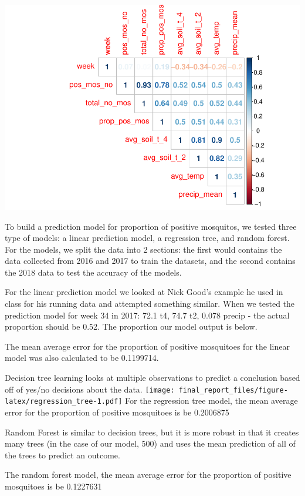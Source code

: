 \documentclass[]{article}
\begin{document}
\includegraphics{final_report_files/figure-latex/correlation_plot-1.pdf}

To build a prediction model for proportion of positive mosquitos, we
tested three type of models: a linear prediction model, a regression
tree, and random forest. For the models, we split the data into 2
sections: the first would contains the data collected from 2016 and 2017
to train the datasets, and the second contains the 2018 data to test the
accuracy of the models.

For the linear prediction model we looked at Nick Good's example he used
in class for his running data and attempted something similar. When we
tested the prediction model for week 34 in 2017: 72.1 t4, 74.7 t2, 0.078
precip - the actual proportion should be 0.52. The proportion our model
output is below.

The mean average error for the proportion of positive mosquitoes for the
linear model was also calculated to be 0.1199714.

Decision tree learning looks at multiple observations to predict a
conclusion based off of yes/no decisions about the data.
\texttt{[image: final\_report\_files/figure-latex/regression\_tree-1.pdf]}
For the regression tree model, the mean average error for the proportion
of positive mosquitoes is be 0.2006875

Random Forest is similar to decision trees, but it is more robust in
that it creates many trees (in the case of our model, 500) and uses the
mean prediction of all of the trees to predict an outcome.

The random forest model, the mean average error for the proportion of
positive mosquitoes is be 0.1227631
\end{document}
